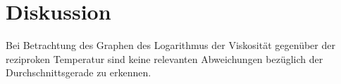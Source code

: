 
\section{Diskussion}
\label{sec:Diskussion}
Bei Betrachtung des Graphen des Logarithmus der Viskosität gegenüber der reziproken
Temperatur sind keine relevanten Abweichungen bezüglich der Durchschnittsgerade
zu erkennen.
